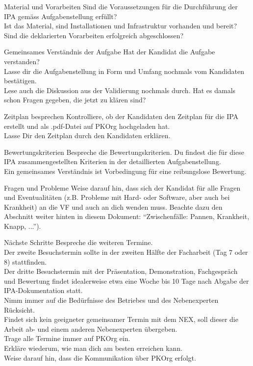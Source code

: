 \begin{taskitem}{Material und Vorarbeiten}
  Sind die Voraussetzungen für die Durchführung der IPA gemäss Aufgabenstellung erfüllt?\\Ist das Material, sind Installationen und Infrastruktur vorhanden und bereit?\\Sind die deklarierten Vorarbeiten erfolgreich abgeschlossen?
\end{taskitem}
\begin{taskitem}{Gemeinsames Verständnis der Aufgabe}
  Hat der Kandidat die Aufgabe verstanden?\\Lasse dir die Aufgabenstellung in Form und Umfang nochmals vom Kandidaten bestätigen.\\Lese auch die Diskussion aus der Validierung nochmals durch. Hat es damals schon Fragen gegeben, die jetzt zu klären sind?
\end{taskitem}
\newpage
\begin{taskitem}{Zeitplan besprechen}
  Kontrolliere, ob der Kandidaten den Zeitplan für die IPA erstellt und als .pdf-Datei auf PKOrg hochgeladen hat.\\Lasse Dir den Zeitplan durch den Kandidaten erklären.
\end{taskitem}
\begin{taskitem}{Bewertungskriterien}
  Bespreche die Bewertungskriterien. Du findest die für diese IPA zusammengestellten Kriterien in der detaillierten Aufgabenstellung.\\Ein gemeinsames Verständnis ist Vorbedingung für eine reibungslose Bewertung.
\end{taskitem}
\begin{taskitem}{Fragen und Probleme}
  Weise darauf hin, dass sich der Kandidat für alle Fragen und Eventualitäten (z.B. Probleme mit Hard- oder Software, aber auch bei Krankheit) an die VF und auch an dich wenden muss. Beachte dazu den Abschnitt weiter hinten in diesem Dokument: \enquote{Zwischenfälle: Pannen, Krankheit, Knapp, ...}).
\end{taskitem}
\newpage
\begin{taskitem}{Nächste Schritte}
  Bespreche die weiteren Termine.\\Der zweite Besuchstermin sollte in der zweiten Hälfte der Facharbeit (Tag 7 oder 8) stattfinden.\\Der dritte Besuchstermin mit der Präsentation, Demonstration, Fachgespräch und Bewertung findet idealerweise etwa eine Woche bis 10 Tage nach Abgabe der IPA-Dokumentation statt.\\Nimm immer auf die Bedürfnisse des Betriebes und des Nebenexperten Rücksicht.\\Findet sich kein geeigneter gemeinsamer Termin mit dem NEX, soll dieser die Arbeit ab- und einem anderen Nebenexperten übergeben.\\Trage alle Termine immer auf PKOrg ein.\\Erkläre wiederum, wie man dich am besten erreichen kann.\\Weise darauf hin, dass die Kommunikation über PKOrg erfolgt.
\end{taskitem}
